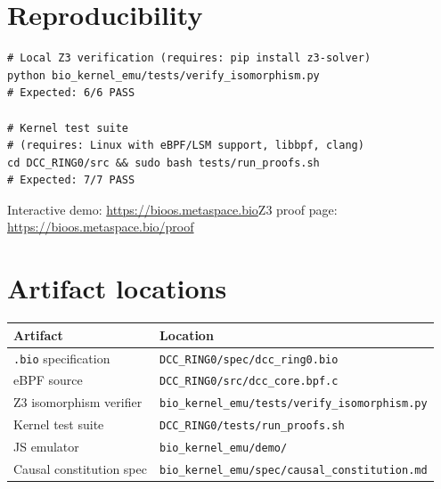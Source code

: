 \documentclass[11pt,a4paper,twoside]{article}
\newcommand{\bioURL}{\url{https://bioos.metaspace.bio}}
\newcommand{\proofURL}{\url{https://bioos.metaspace.bio/proof}}
\begin{document}
\appendix

\section{Reproducibility}

\begin{lstlisting}[style=shellstyle]
# Local Z3 verification (requires: pip install z3-solver)
python bio_kernel_emu/tests/verify_isomorphism.py
# Expected: 6/6 PASS

# Kernel test suite
# (requires: Linux with eBPF/LSM support, libbpf, clang)
cd DCC_RING0/src && sudo bash tests/run_proofs.sh
# Expected: 7/7 PASS
\end{lstlisting}

Interactive demo: \bioURL\quad Z3 proof page: \proofURL

\section{Artifact locations}

\begin{tabular}{@{}ll@{}}
\toprule
\textbf{Artifact} & \textbf{Location} \\ \midrule
\texttt{.bio} specification   & \texttt{DCC\_RING0/spec/dcc\_ring0.bio} \\
eBPF source                   & \texttt{DCC\_RING0/src/dcc\_core.bpf.c} \\
Z3 isomorphism verifier       & \texttt{bio\_kernel\_emu/tests/verify\_isomorphism.py} \\
Kernel test suite             & \texttt{DCC\_RING0/tests/run\_proofs.sh} \\
JS emulator                   & \texttt{bio\_kernel\_emu/demo/} \\
Causal constitution spec      & \texttt{bio\_kernel\_emu/spec/causal\_constitution.md} \\
\bottomrule
\end{tabular}
\end{document}
